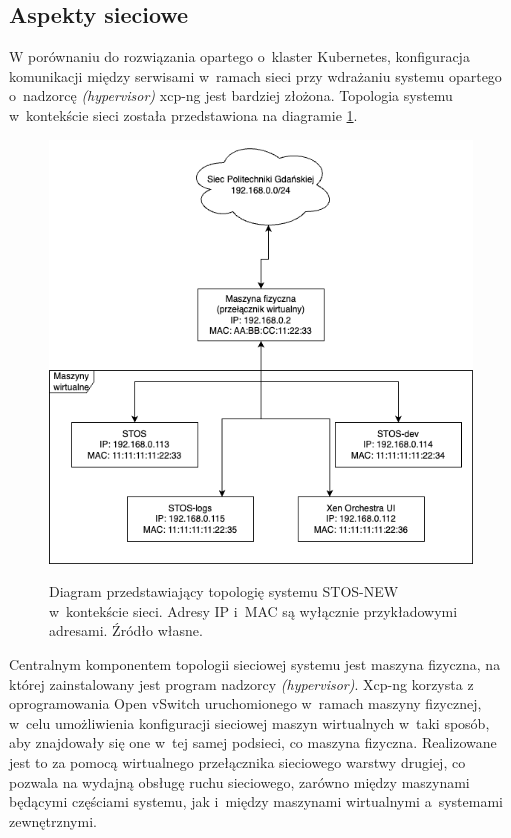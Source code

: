 \subsection{Aspekty sieciowe}
W porównaniu do rozwiązania opartego o~klaster Kubernetes, konfiguracja komunikacji między serwisami w~ramach sieci przy wdrażaniu systemu opartego o~nadzorcę \textit{(hypervisor)} xcp-ng jest bardziej złożona. Topologia systemu w~kontekście sieci została przedstawiona na diagramie \ref{diagramSiecStos}.
\begin{figure}[!h]
	\begin{center}
		\resizebox{0.7\textwidth}{!} {
			\includegraphics{img/4/wdrozeniesiec.png}
		}
		\caption[Topologia sieciowa wdrożonego systemu STOS-NEW]{Diagram przedstawiający topologię systemu STOS-NEW w~kontekście sieci. Adresy IP i~MAC są wyłącznie przykładowymi adresami. Źródło własne.}
		\label{diagramSiecStos}
	\end{center}
\end{figure}
\noindent Centralnym komponentem topologii sieciowej systemu jest maszyna fizyczna, na której zainstalowany jest program nadzorcy \textit{(hypervisor)}. Xcp-ng korzysta z oprogramowania Open vSwitch uruchomionego w~ramach maszyny fizycznej, w~celu umożliwienia konfiguracji sieciowej maszyn wirtualnych w~taki sposób, aby znajdowały się one w~tej samej podsieci, co maszyna fizyczna\cite{xcpNetwork}. Realizowane jest to za pomocą wirtualnego przełącznika sieciowego warstwy drugiej, co pozwala na wydajną obsługę ruchu sieciowego, zarówno między maszynami będącymi częściami systemu, jak i~między maszynami wirtualnymi a~systemami zewnętrznymi\cite{vswitch}.
